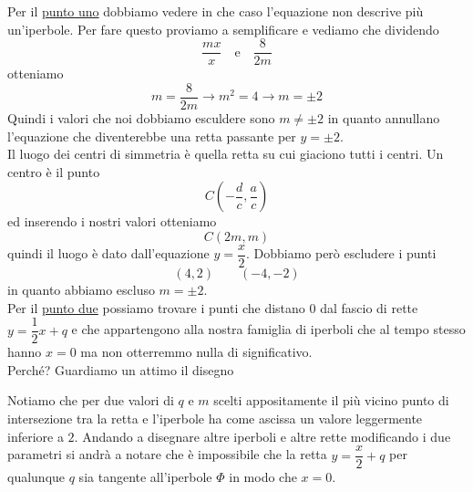 Per il \hyperref[enum:ex:aff:2:1]{punto uno} dobbiamo vedere in che caso l'equazione non
descrive più un'iperbole. Per fare questo proviamo a semplificare e vediamo che dividendo
\begin{equation*}
  \frac{mx}{x} \quad \text{e} \quad \frac{8}{2m}
\end{equation*}
otteniamo
\begin{equation*}
  m = \frac{8}{2m} \rightarrow m^2 = 4 \rightarrow \boxed{m=\pm2}
\end{equation*}
Quindi i valori che noi dobbiamo esculdere sono $m\neq\pm2$ in quanto annullano l'equazione che
diventerebbe una retta passante per $y=\pm2$.\\
Il luogo dei centri di simmetria è quella retta su cui giaciono tutti i centri. Un centro è il punto
\begin{equation*}
  C\left(-\frac{d}{c},\frac{a}{c}\right)
\end{equation*}
ed inserendo i nostri valori otteniamo
\begin{equation*}
  C(2m,m)
\end{equation*}
quindi il luogo è dato dall'equazione $\boxed{y=\dfrac{x}{2}}$. Dobbiamo però escludere i punti
\begin{equation*}
  (4,2)\qquad(-4,-2)
\end{equation*}
in quanto abbiamo escluso $m=\pm2$.\\[\baselineskip]

Per il \hyperref[enum:ex:aff:2:2]{punto due} possiamo trovare i punti che distano $0$ dal fascio di
rette $y=\dfrac{1}{2}x+q$ e che appartengono alla nostra famiglia di iperboli che al tempo stesso
hanno $x=0$ ma non otterremmo nulla di significativo.\\
Perché? Guardiamo un attimo il disegno
\begin{center}
\end{center}
Notiamo che per due valori di $q$ e $m$ scelti appositamente il più vicino punto di intersezione tra 
la retta e l'iperbole ha come ascissa un valore leggermente inferiore a $2$. Andando a disegnare altre
iperboli e altre rette modificando i due parametri si andrà a notare che è impossibile che la retta
$y=\dfrac{x}{2}+q$ per qualunque $q$ sia tangente all'iperbole $\Phi$ in modo che $x=0$.\\[\baselineskip]

